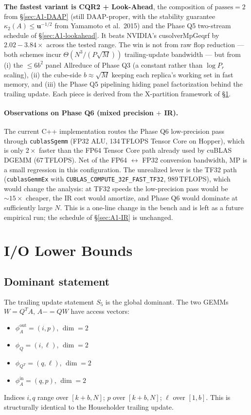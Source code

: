 \documentclass[11pt]{article}
\begin{document}
\textbf{The fastest variant is CQR2 + Look-Ahead}, the composition of
$\mathrm{passes} = 2$ from \S\ref{sec:A1-DAAP} (still DAAP-proper, with
the stability guarantee $\kappa_2(A) \le \mathbf{u}^{-1/2}$ from
Yamamoto et al.~2015) and the Phase Q5 two-stream schedule of
\S\ref{sec:A1-lookahead}. It beats NVIDIA's cusolverMpGeqrf by
$2.02{-}3.84\times$ across the tested range. The win is not from raw
flop reduction --- both schemes incur $\Theta(N^3 / (P \sqrt{M}))$
trailing-update bandwidth --- but from (i) the $\le 6 b^2$ panel
Allreduce of Phase Q3 (a constant rather than $\log P_r$ scaling), (ii)
the cube-side $b \approx \sqrt{M}$ keeping each replica's working set
in fast memory, and (iii) the Phase Q5 pipelining hiding panel
factorization behind the trailing update. Each piece is derived from
the X-partition framework of \S\ref{sec:A2}.

\paragraph{Observations on Phase Q6 (mixed precision $+$ IR).}
The current C++ implementation routes the Phase Q6 low-precision pass
through \texttt{cublasSgemm} (FP32 ALU, 134\,TFLOPS Tensor Core on
Hopper), which is only $2\times$ faster than the FP64 Tensor Core path
already used by cuBLAS DGEMM ($67$\,TFLOPS). Net of the FP64 $\leftrightarrow$
FP32 conversion bandwidth, MP is a small regression in this
configuration. The unrealized lever is the TF32 path
(\texttt{cublasGemmEx} with \texttt{CUBLAS\_COMPUTE\_32F\_FAST\_TF32},
$989$\,TFLOPS), which would change the analysis: at TF32 speeds the
low-precision pass would be $\sim 15 \times$ cheaper, the IR cost
would amortize, and Phase Q6 would dominate at sufficiently large $N$.
This is a one-line change in the bench and is left as a future
empirical run; the schedule of \S\ref{sec:A1-IR} is unchanged.

\section{I/O Lower Bounds}
\label{sec:A2}

\subsection{Dominant statement}
\label{sec:A2a}

The trailing update statement $S_5$ is the global dominant. The two
GEMMs $W = Q^T A$, $A {-}{=} QW$ have access vectors:
\begin{itemize}[leftmargin=2em]
  \item $\phi^{\mathrm{out}}_A = (i,p)$, $\dim = 2$
  \item $\phi_Q = (i,\ell)$, $\dim = 2$
  \item $\phi_{Q^T} = (q,\ell)$, $\dim = 2$
  \item $\phi^{\mathrm{in}}_A = (q,p)$, $\dim = 2$
\end{itemize}
Indices $i,q$ range over $[k+b, N]$; $p$ over $[k+b, N]$; $\ell$ over
$[1,b]$. This is structurally identical to the Householder trailing
update.
\end{document}
